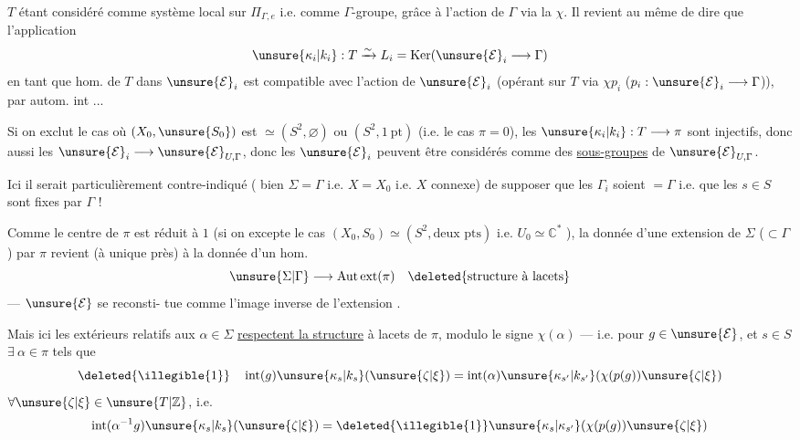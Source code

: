 
$T$ étant considéré comme système local
sur $\Pi_{\Gamma,e}$  i.e. comme $\Gamma$-groupe, grâce à l'action
de $\Gamma$ via la  $\chi$. Il revient au
même de dire que  l'application
\[
\unsure{\kappa_i|k_i}:T\xrightarrow{\sim}L_i=\operatorname{Ker}(\unsure{\mathcal E}_i\longrightarrow\Gamma)
\]
en tant que hom. de $T$ dans $\unsure{\mathcal E}_i$ est
compatible avec l'action de $\unsure{\mathcal E}_i$ (opérant
sur $T$ via $\chi p_i$ ($p_i:\unsure{\mathcal E}_i\longrightarrow\Gamma$)), 
 par autom. int ...

Si on exclut le cas où $(X_0,\unsure{S_0})$
est $\simeq(S^2,\varnothing)$ ou $(S^2,1\ \mathrm{pt})$ (i.e.
le cas $\pi=0$), les $\unsure{\kappa_i|k_i}:T\longrightarrow\pi$ sont injectifs,
donc aussi les $\unsure{\mathcal E}_i\longrightarrow\unsure{\mathcal E}_{U,\Gamma}$, donc les
$\unsure{\mathcal E}_i$ peuvent être considérés comme des
\uline{sous-groupes} de $\unsure{\mathcal E}_{U,\Gamma}$.

\unsure{\S} Ici il  serait particulièrement
contre-indiqué ( bien  $\Sigma=\Gamma$ i.e.
$X=X_0$ i.e. $X$ connexe) de supposer que
les $\Gamma_i$ soient $=\Gamma$ i.e. que les $s\in S$ sont fixes
par $\Gamma$ !


Comme le centre de $\pi$ est réduit à $1$
(si on excepte  le cas $(X_0,S_0)\simeq(S^2,\text{deux pts})$
i.e. $U_0\simeq\mathbb C^*$ ), la donnée d'une extension
de $\Sigma$ ($\subset\Gamma$) par $\pi$ revient (à  unique
près) à la donnée d'un hom.
\[
\unsure{\Sigma|\Gamma}\longrightarrow\mathrm{Aut\,ext}(\pi)\quad\deleted{\text{structure à lacets}}
\]
 --- $\unsure{\mathcal E}$ se reconsti-
tue comme l'image inverse de l'extension
.

Mais ici les  extérieurs relatifs
aux $\alpha\in\Sigma$  \uline{respectent la structure}
à lacets  de $\pi$, modulo le
signe $\chi(\alpha)$ --- i.e. pour $g\in\unsure{\mathcal E}$, et $s\in S$
$\exists\ \alpha\in\pi$  tels que
\[
\deleted{\illegible{1}}\quad
\operatorname{int}(g)\unsure{\kappa_s|k_s}(\unsure{\zeta|\xi})
=\operatorname{int}(\alpha)\unsure{\kappa_{s'}|k_{s'}}(\chi(p(g))\unsure{\zeta|\xi})
\]
$\forall\unsure{\zeta|\xi}\in\unsure{T|\mathbb Z}$, i.e.
\[
\operatorname{int}(\alpha^{-1}g)\unsure{\kappa_s|k_s}(\unsure{\zeta|\xi})
=\deleted{\illegible{1}}\unsure{\kappa_s|\kappa_{s'}}(\chi(p(g))\unsure{\zeta|\xi})
\]

